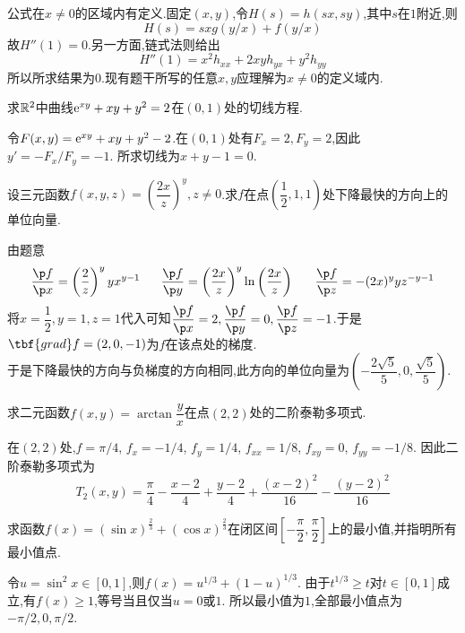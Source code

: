 \documentclass{ctexart}
\begin{document}
\begin{solution}
公式在$x\neq0$的区域内有定义.固定$(x,y)$,令$H(s)=h(sx,sy)$,其中$s$在$1$附近,则
\[H(s)=sxg(y/x)+f(y/x)\]
故$H''(1)=0$.另一方面,链式法则给出
\[H''(1)=x^2h_{xx}+2xyh_{yx}+y^2h_{yy}\]
所以所求结果为$0$.现有题干所写的任意$x,y$应理解为$x\neq0$的定义域内.
\end{solution}
\begin{problem}[4.(10\songti{分})]
求$\mathbb{R}^2$中曲线$\mathrm{e}^{xy}+xy+y^2=2$在$(0,1)$处的切线方程.
\end{problem}
\begin{solution}
令$F(x,y)=\mathrm{e}^{xy}+xy+y^2-2$.在$(0,1)$处有$F_x=2,F_y=2$,因此$y'=-F_x/F_y=-1$.
所求切线为$x+y-1=0$.
\end{solution}
\begin{problem}[5.(10\songti{分})]
设三元函数$f(x,y,z)=\left(\dfrac{2x}{z}\right)^{y},z\neq0$.求$f$在点$\left(\dfrac{1}{2},1,1\right)$处下降最快的方向上的单位向量.
\end{problem}
\begin{solution}
由题意$$\dfrac{\p f}{\p x}=\left(\dfrac{2}{z}\right)^yyx^{y-1}\ \ \ \ \ 
    \dfrac{\p f}{\p y}=\left(\dfrac{2x}{z}\right)^y\ln\left(\dfrac{2x}{z}\right)\ \ \ \ \
    \dfrac{\p f}{\p z}=-(2x)^yyz^{-y-1}$$
    将$x=\dfrac12,y=1,z=1$代入可知$\dfrac{\p f}{\p x}=2,\dfrac{\p f}{\p y}=0,\dfrac{\p f}{\p z}=-1$.于是$\tbf{grad}f=\left(2,0,-1\right)$为$f$在该点处的梯度.\\
    于是下降最快的方向与负梯度的方向相同,此方向的单位向量为$\left(-\dfrac{2\sqrt5}{5},0,\dfrac{\sqrt5}{5}\right)$.
\end{solution}
\begin{problem}[6.(10\songti{分})]
求二元函数$f(x,y)=\arctan\dfrac{y}{x}$在点$(2,2)$处的二阶泰勒多项式.
\end{problem}
\begin{solution}
在$(2,2)$处,$f=\pi/4$, $f_x=-1/4$, $f_y=1/4$, $f_{xx}=1/8$, $f_{xy}=0$, $f_{yy}=-1/8$.
因此二阶泰勒多项式为
\[T_2(x,y)=\dfrac\pi4-\dfrac{x-2}{4}+\dfrac{y-2}{4}+\dfrac{(x-2)^2}{16}-\dfrac{(y-2)^2}{16}\]
\end{solution}
\begin{problem}[7.(10\songti{分})]
求函数$f(x)=\left(\sin x\right)^{\frac{2}{3}}+\left(\cos x\right)^{\frac{2}{3}}$在闭区间$\left[-\dfrac{\pi}{2},\dfrac{\pi}{2}\right]$上的最小值,并指明所有最小值点.
\end{problem}
\begin{solution}
令$u=\sin^2x\in[0,1]$,则$f(x)=u^{1/3}+(1-u)^{1/3}$.
由于$t^{1/3}\geqslant t$对$t\in[0,1]$成立,有$f(x)\geqslant1$,等号当且仅当$u=0$或$1$.
所以最小值为$1$,全部最小值点为$-\pi/2,0,\pi/2$.
\end{solution}
\end{document}
